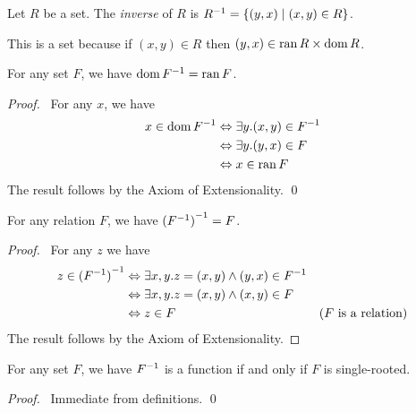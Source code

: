 \begin{definition}
    Let $R$ be a set. The \emph{inverse} of $R$ is ${R}^{-1} = \{ (y,x) \mid (x,y) \in R \}$.

    This is a set because if $(x,y) \in R$ then $(y,x) \in \operatorname{ran} R \times \operatorname{dom} R$.
\end{definition}

\begin{theorem}
    \label{theorem:dom_inv}
    For any set $F$, we have $\operatorname{dom} {F}^{-1} = \operatorname{ran} F$.
\end{theorem}

\begin{proof}
    \pf\ For any $x$, we have
    \begin{align*}
        x \in \operatorname{dom} {F}^{-1} & \Leftrightarrow \exists y. (x,y) \in {F}^{-1} \\
        & \Leftrightarrow \exists y. (y,x) \in F \\
        & \Leftrightarrow x \in \operatorname{ran} F
    \end{align*}
    The result follows by the Axiom of Extensionality. \qed
\end{proof}

\begin{theorem}
    \label{theorem:inv_inv}
    For any relation $F$, we have ${({F}^{-1})}^{-1} = F$.
\end{theorem}

\begin{proof}
    \pf\ For any $z$ we have
    \begin{align*}
        z \in {(\ensuremath{{F}^{-1}})}^{-1} & \Leftrightarrow \exists x, y. z = (x,y) \wedge (y,x) \in {F}^{-1} \\
        & \Leftrightarrow \exists x,y. z = (x,y) \wedge (x,y) \in F \\
        & \Leftrightarrow z \in F & (\text{$F$ is a relation})
    \end{align*}
    The result follows by the Axiom of Extensionality.
\end{proof}

\begin{theorem}
    For any set $F$, we have ${F}^{-1}$ is a function if and only if $F$ is single-rooted.
\end{theorem}

\begin{proof}
    \pf\ Immediate from definitions. \qed
\end{proof}

